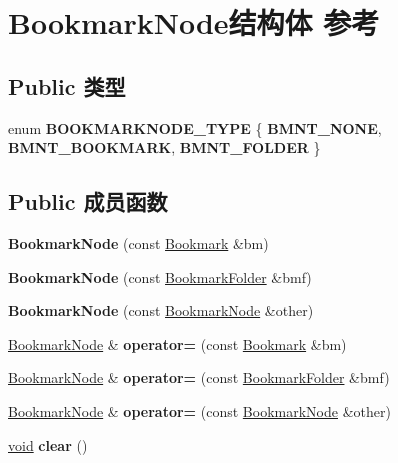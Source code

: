 \hypertarget{struct_bookmark_node}{}\section{Bookmark\+Node结构体 参考}
\label{struct_bookmark_node}
\subsection*{Public 类型}
\begin{DoxyCompactItemize}
\item 
\mbox{\label{struct_bookmark_node_a1a794e5ae07d6f546561f91dae9b0796}} 
enum {\bfseries B\+O\+O\+K\+M\+A\+R\+K\+N\+O\+D\+E\+\_\+\+T\+Y\+PE} \{ {\bfseries B\+M\+N\+T\+\_\+\+N\+O\+NE}, 
{\bfseries B\+M\+N\+T\+\_\+\+B\+O\+O\+K\+M\+A\+RK}, 
{\bfseries B\+M\+N\+T\+\_\+\+F\+O\+L\+D\+ER}
 \}
\end{DoxyCompactItemize}
\subsection*{Public 成员函数}
\begin{DoxyCompactItemize}
\item 
\mbox{\label{struct_bookmark_node_a1982c4f3115cb730dd43440679cd5960}} 
{\bfseries Bookmark\+Node} (const \hyperlink{struct_bookmark}{Bookmark} \&bm)
\item 
\mbox{\label{struct_bookmark_node_a5824446130f2dd63b6581a8aa9c74790}} 
{\bfseries Bookmark\+Node} (const \hyperlink{struct_bookmark_folder}{Bookmark\+Folder} \&bmf)
\item 
\mbox{\label{struct_bookmark_node_af17de1b9d083d18333d6f696b8b9624e}} 
{\bfseries Bookmark\+Node} (const \hyperlink{struct_bookmark_node}{Bookmark\+Node} \&other)
\item 
\mbox{\label{struct_bookmark_node_a2dc162374d62c4e3fa66d9bd6c533631}} 
\hyperlink{struct_bookmark_node}{Bookmark\+Node} \& {\bfseries operator=} (const \hyperlink{struct_bookmark}{Bookmark} \&bm)
\item 
\mbox{\label{struct_bookmark_node_a5641755d52fdac8398208d14c3018271}} 
\hyperlink{struct_bookmark_node}{Bookmark\+Node} \& {\bfseries operator=} (const \hyperlink{struct_bookmark_folder}{Bookmark\+Folder} \&bmf)
\item 
\mbox{\label{struct_bookmark_node_ae2c5b0722c765ad814f072ee30d9dfd8}} 
\hyperlink{struct_bookmark_node}{Bookmark\+Node} \& {\bfseries operator=} (const \hyperlink{struct_bookmark_node}{Bookmark\+Node} \&other)
\item 
\mbox{\label{struct_bookmark_node_a223750d5ae0e6d87044c05e45ce98d92}} 
\hyperlink{interfacevoid}{void} {\bfseries clear} ()
\end{DoxyCompactItemize}
